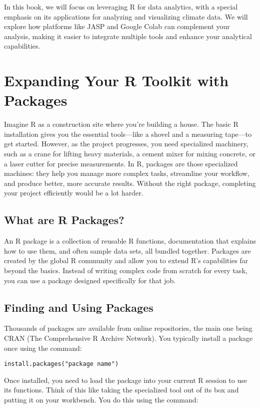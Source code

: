 In this book, we will focus on leveraging R for data analytics, with a special emphasis on its applications for analyzing and visualizing climate data. We will explore how platforms like JASP and Google Colab can complement your analysis, making it easier to integrate multiple tools and enhance your analytical capabilities.

\section{Expanding Your R Toolkit with Packages}

Imagine R as a construction site where you’re building a house. The basic R installation gives you the essential tools—like a shovel and a measuring tape—to get started. However, as the project progresses, you need specialized machinery, such as a crane for lifting heavy materials, a cement mixer for mixing concrete, or a laser cutter for precise measurements. In R, packages are those specialized machines: they help you manage more complex tasks, streamline your workflow, and produce better, more accurate results. Without the right package, completing your project efficiently would be a lot harder.

\subsection{What are R Packages?}

An R package is a collection of reusable R functions, documentation that explains how to use them, and often sample data sets, all bundled together. Packages are created by the global R community and allow you to extend R’s capabilities far beyond the basics. Instead of writing complex code from scratch for every task, you can use a package designed specifically for that job.

\subsection{Finding and Using Packages}

Thousands of packages are available from online repositories, the main one being CRAN (The Comprehensive R Archive Network). You typically install a package once using the command:

\begin{verbatim}
install.packages("package name")
\end{verbatim}

Once installed, you need to load the package into your current R session to use its functions. Think of this like taking the specialized tool out of its box and putting it on your workbench. You do this using the command:

